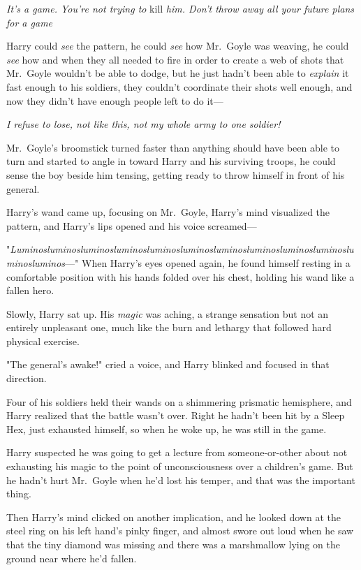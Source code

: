 \emph{It's a game. You're not trying to} kill \emph{him. Don't throw away all
your future plans for a game{\el}}

Harry could \emph{see} the pattern, he could \emph{see} how Mr.~Goyle was
weaving, he could \emph{see} how and when they all needed to fire in order to
create a web of shots that Mr.~Goyle wouldn't be able to dodge, but he just
hadn't been able to \emph{explain} it fast enough to his soldiers, they
couldn't coordinate their shots well enough, and now they didn't have enough
people left to do it---

\emph{I refuse to lose, not like this, not my whole army to one soldier!}

Mr.~Goyle's broomstick turned faster than anything should have been able to
turn and started to angle in toward Harry and his surviving troops, he could
sense the boy beside him tensing, getting ready to throw himself in front of
his general.


Harry's wand came up, focusing on Mr.~Goyle, Harry's mind visualized the
pattern, and Harry's lips opened and his voice screamed---

"\emph{Lu\-min\-os\-lu\-min\-os\-lu\-min\-os\-lu\-min\-os\-lu\-min\-os\-lu\-min\-os\-lu\-min\-os\-lu\-min\-os\-lu\-min\-os\-lu\-min\-os\-lu\-min\-os\-lu\-min\-os}\mbox{---}"
\sbreak
When Harry's eyes opened again, he found himself resting in a comfortable
position with his hands folded over his chest, holding his wand like a fallen
hero.

Slowly, Harry sat up. His \emph{magic} was aching, a strange sensation but not
an entirely unpleasant one, much like the burn and lethargy that followed hard
physical exercise.

"The general's awake!" cried a voice, and Harry blinked and focused in that
direction.

Four of his soldiers held their wands on a shimmering prismatic hemisphere, and
Harry realized that the battle wasn't over. Right{\el} he hadn't been hit by
a Sleep Hex, just exhausted himself, so when he woke up, he was still in the
game.

Harry suspected he was going to get a lecture from someone-or-other about not
exhausting his magic to the point of unconsciousness over a children's game.
But he hadn't hurt Mr.~Goyle when he'd lost his temper, and that was the
important thing.

Then Harry's mind clicked on another implication, and he looked down at the
steel ring on his left hand's pinky finger, and almost swore out loud when he
saw that the tiny diamond was missing and there was a marshmallow lying on the
ground near where he'd fallen.

